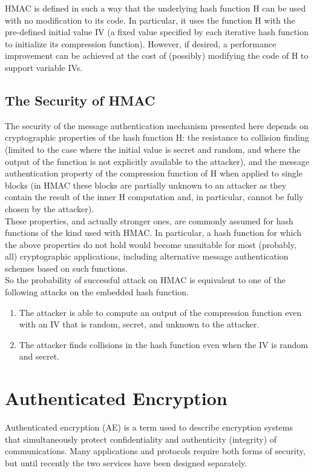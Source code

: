 \documentclass[12pt,a4paper,oneside]{report}
\begin{document}
HMAC is defined in such a way that the underlying hash function H can
   be used with no modification to its code. In particular, it uses the
   function H with the pre-defined initial value IV (a fixed value
   specified by each iterative hash function to initialize its
   compression function).  However, if desired, a performance
   improvement can be achieved at the cost of (possibly) modifying the
   code of H to support variable IVs.\\

\subsection{The Security of HMAC}

The security of the message authentication mechanism presented here
   depends on cryptographic properties of the hash function H: the
   resistance to collision finding (limited to the case where the
   initial value is secret and random, and where the output of the
   function is not explicitly available to the attacker), and the
   message authentication property of the compression function of H when
   applied to single blocks (in HMAC these blocks are partially unknown
   to an attacker as they contain the result of the inner H computation
   and, in particular, cannot be fully chosen by the attacker).\\

These properties, and actually stronger ones, are commonly assumed
   for hash functions of the kind used with HMAC. In particular, a hash
   function for which the above properties do not hold would become
   unsuitable for most (probably, all) cryptographic applications,
   including alternative message authentication schemes based on such
   functions.\\

So the probability of successful attack on HMAC is equivalent to one of the following attacks on the embedded hash function.
\begin{enumerate}[(1)]
    \item The attacker is able to compute an output of the compression function even
with an IV that is random, secret, and unknown to the attacker.
    \item The attacker finds collisions in the hash function even when the IV is random
and secret.
\end{enumerate}

\section{Authenticated Encryption}
Authenticated encryption (AE) is a term used to describe encryption systems that simultaneously protect confidentiality and authenticity (integrity) of communications. Many applications and protocols require both forms of security, but until recently the two services have been designed separately.\\
\end{document}

